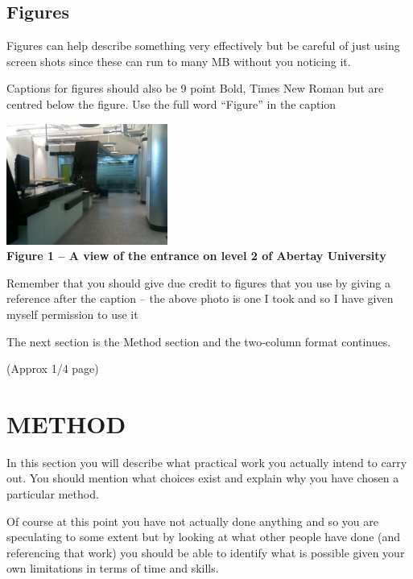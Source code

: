 \documentclass[9pt]{extarticle} %
\begin{document}
\begin{multicols}{2}
\subsection{Figures}

Figures can help describe something very effectively but be careful of just using screen shots since these can run to many MB without you noticing it.

Captions for figures should also be 9 point Bold, Times New Roman but are centred below the figure. Use the full word ``Figure'' in the caption

\begin{center}
    \noindent \includegraphics*[width=200px, height=150px]{images/image1} %
    \\
    \textbf{Figure 1 -- A view of the entrance on level 2 of Abertay University}
\end{center}

Remember that you should give due credit to figures that you use by giving a reference after the caption -- the above photo is one I took and so I have given myself permission to use it

The next section is the Method section and the two-column format continues.

(Approx 1/4 page)

\section{METHOD}

In this section you will describe what practical work you actually intend to carry out. You should mention what choices exist and explain why you have chosen a particular method. 

Of course at this point you have not actually done anything and so you are speculating to some extent but by looking at what other people have done (and referencing that work) you should be able to identify what is possible given your own limitations in terms of time and skills.


\end{multicols}
\end{document}
